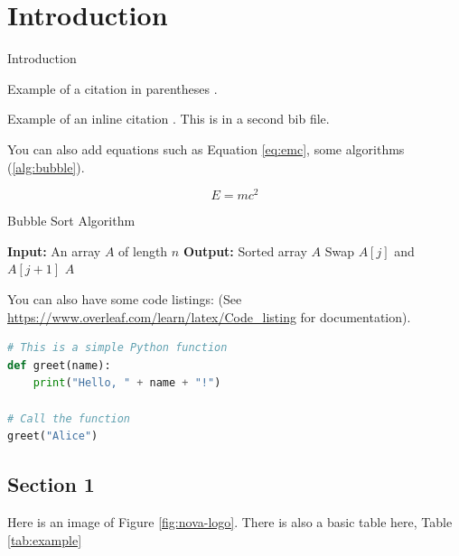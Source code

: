 \chapter{Introduction}


Introduction

Example of a citation in parentheses \parencite{example2022}.

\blindtext

Example of an inline citation \cite{einstein}. This is in a second bib file.

You can also add equations such as Equation \ref{eq:emc}, some algorithms (\ref{alg:bubble}).

\begin{equation}
    E = mc^2
    \label{eq:emc}
\end{equation}


\begin{algorithm}
    \caption{Bubble Sort Algorithm}
    \label{alg:bubble}
    \begin{algorithmic}[1]
        \STATE \textbf{Input:} An array $A$ of length $n$
        \STATE \textbf{Output:} Sorted array $A$
                    \STATE Swap $A[j]$ and $A[j+1]$
                \ENDIF
            \ENDFOR
        \ENDFOR
        \RETURN $A$
    \end{algorithmic}
\end{algorithm}

You can also have some code listings: (See \url{https://www.overleaf.com/learn/latex/Code_listing} for documentation).

\begin{lstlisting}[language=Python, caption=Example Listing]
# This is a simple Python function
def greet(name):
    print("Hello, " + name + "!")

# Call the function
greet("Alice")
\end{lstlisting}


\section{Section 1}

Here is an image of Figure \ref{fig:nova-logo}. There is also a basic table here, Table \ref{tab:example}



\blindtext



